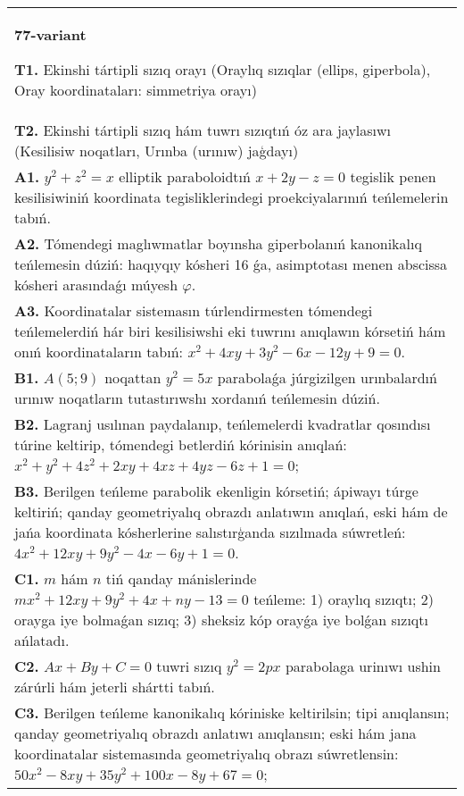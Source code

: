 \documentclass{article}
\begin{document}
\begin{tabular}{m{17cm}}
\textbf{77-variant}
\newline

\textbf{T1.} Ekinshi tártipli sızıq orayı (Oraylıq sızıqlar (ellips, giperbola), Oray koordinataları: simmetriya orayı) \\
\textbf{T2.} Ekinshi tártipli sızıq hám tuwrı sızıqtıń óz ara jaylasıwı (Kesilisiw noqatları, Urınba (urınıw) jaģdayı) \\
\textbf{A1.} $y^2+z^2=x$ elliptik paraboloidtıń $x+2 y-z=0$ tegislik penen kesilisiwiniń koordinata tegisliklerindegi proekciyalarınıń teńlemelerin tabıń. \\
\textbf{A2.} Tómendegi maglıwmatlar boyınsha giperbolanıń kanonikalıq teńlemesin dúziń: haqıyqıy kósheri 16 ǵa, asimptotası menen abscissa kósheri arasındaǵı múyesh $\varphi$. \\
\textbf{A3.} Koordinatalar sistemasın túrlendirmesten tómendegi teńlemelerdiń hár biri kesilisiwshi eki tuwrını anıqlawın kórsetiń hám onıń koordinataların tabıń: $x^2+4 x y+3 y^2-6 x-12 y+9=0$. \\
\textbf{B1.} $A (5;9) $ noqattan $y^2=5x$ parabolaǵa júrgizilgen urınbalardıń urınıw noqatların tutastırıwshı xordanıń teńlemesin dúziń. \\
\textbf{B2.} Lagranj usılınan paydalanıp, teńlemelerdi kvadratlar qosındısı túrine keltirip, tómendegi betlerdiń kórinisin anıqlań: $x^2+y^2+4 z^2+2 x y+4 x z+4 y z-6 z+1=0$; \\
\textbf{B3.} Berilgen teńleme parabolik ekenligin kórsetiń; ápiwayı túrge keltiriń; qanday geometriyalıq obrazdı anlatıwın anıqlań, eski hám de jańa koordinata kósherlerine salıstırģanda sızılmada súwretleń:$4 x^2+12 x y+9 y^2-4 x-6 y+1=0$. \\
\textbf{C1.} $m$ hám $n$ tiń qanday mánislerinde $m x^2+12 x y+9 y^2+4 x+n y-13=0$ teńleme: 1) oraylıq sızıqtı; 2) orayga iye bolmaǵan sızıq; 3) sheksiz kóp orayǵa iye bolǵan sızıqtı ańlatadı. \\
\textbf{C2.} $A x+B y+C=0$ tuwri sızıq $y^2=2 p x$ parabolaga urinıwı ushin zárúrli hám jeterli shártti tabıń. \\
\textbf{C3.} Berilgen teńleme kanonikalıq kóriniske keltirilsin; tipi anıqlansın; qanday geometriyalıq obrazdı anlatıwı anıqlansın; eski hám jana koordinatalar sistemasında geometriyalıq obrazı súwretlensin: $50 x^2-8 x y+35 y^2+100 x-8 y+67=0$; \\

\end{tabular}
\vspace{1cm}
\end{document}
